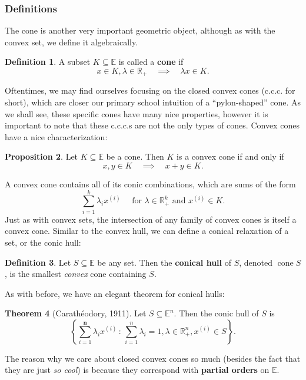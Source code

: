 \documentclass{article}
\numberwithin{equation}{section}
\theoremstyle{definition}
\newtheorem{theorem}{Theorem}[section]
\newtheorem{proposition}[theorem]{Proposition}
\newtheorem{definition}[theorem]{Definition}%
\newcommand{\bE}{\mathbb{E}}
\newcommand{\bR}{\mathbb{R}}
\newcommand{\AND}{\text{ and }}
\newcommand{\FOR}{\text{ for }}
\newcommand{\set}[2]{\left\{#1\,:\,#2\right\}}
\newcommand{\cone}{\operatorname{cone}}
\begin{document}
\subsubsection{Definitions}
The cone is another very important geometric object, although as with the convex set, we define it algebraically.
\begin{definition}
    A subset $K\subseteq\bE$ is called a \textbf{cone} if
    \begin{equation}
        x\in K, \lambda\in\bR_+\quad\implies\quad \lambda x\in K.
    \end{equation}
\end{definition}
Oftentimes, we may find ourselves focusing on the closed convex cones (c.c.c. for short), which are closer our primary school intuition of a ``pylon-shaped'' cone. As we shall see, these specific cones have many nice properties, however it is important to note that these c.c.c.s are not the only types of cones. Convex cones have a nice characterization:
\begin{proposition}
    Let $K\subseteq\bE$ be a cone. Then $K$ is a convex cone if and only if
    \begin{equation}
        x, y\in K\quad\implies\quad x+y\in K.
    \end{equation}
\end{proposition}
A convex cone contains all of its conic combinations, which are sums of the form
\begin{equation}
    \sum_{i=1}^k\lambda_ix^{(i)}
\quad\FOR \lambda\in\bR^k_+ \AND x^{(i)}\in K.
\end{equation}
Just as with convex sets, the intersection of any family of convex cones is itself a convex cone. Similar to the convex hull, we can define a conical relaxation of a set, or the conic hull:
\begin{definition}
    Let $S\subseteq\bE$ be any set. Then the \textbf{conical hull} of $S$, denoted $\cone S$, is the smallest \textit{convex} cone containing $S$.
\end{definition}
As with before, we have an elegant theorem for conical hulls:
\begin{theorem}[Carath\'eodory, 1911]
    \label{thmcaratheodory2}%
    Let $S\subseteq\bE^n$. Then the conic hull of $S$ is
    \begin{equation}
        \label{thmcaratheodory2eq}
        \set{\sum_{i=1}^{\mathbf{n}}\lambda_ix^{(i)}}{ \sum_{i=1}^{n}\lambda_i=1, \lambda\in \bR_+^{n}, x^{(i)}\in S}.
    \end{equation}
\end{theorem}
The reason why we care about closed convex cones so much (besides the fact that they are just \textit{so cool}) is because they correspond with \textbf{partial orders} on $\bE$.
\end{document}
